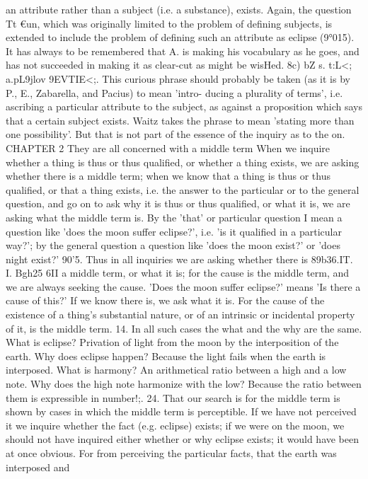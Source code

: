 an attribute rather than a subject (i.e. a substance), exists.
Again, the question Tt €un, which was originally limited to the
problem of defining subjects, is extended to include the problem
of defining such an attribute as eclipse (9°015). It has always to
be remembered that A. is making his vocabulary as he goes, and
has not succeeded in making it as clear-cut as might be wisHed.
8c) bZ s. t:L<; a.pL9jlov 9EVTIE<;. This curious phrase should probably
be taken (as it is by P., E., Zabarella, and Pacius) to mean 'intro-
ducing a plurality of terms', i.e. ascribing a particular attribute
to the subject, as against a proposition which says that a certain
subject exists. Waitz takes the phrase to mean 'stating more than
one possibility'. But that is not part of the essence of the inquiry
as to the on.
CHAPTER 2
They are all concerned with a middle term
When we inquire whether a thing is thus or thus
qualified, or whether a thing exists, we are asking whether there
is a middle term; when we know that a thing is thus or thus
qualified, or that a thing exists, i.e. the answer to the particular
or to the general question, and go on to ask why it is thus or
thus qualified, or what it is, we are asking what the middle term
is. By the 'that' or particular question I mean a question like
'does the moon suffer eclipse?', i.e. 'is it qualified in a particular
way?'; by the general question a question like 'does the moon
exist?' or 'does night exist?'
90'5. Thus in all inquiries we are asking whether there is
89b36.IT.
I.
Bgh25
6II
a middle term, or what it is; for the cause is the middle term, and
we are always seeking the cause. 'Does the moon suffer eclipse?'
means 'Is there a cause of this?' If we know there is, we ask
what it is. For the cause of the existence of a thing's substantial
nature, or of an intrinsic or incidental property of it, is the
middle term.
14. In all such cases the what and the why are the same. What
is eclipse? Privation of light from the moon by the interposition
of the earth. Why does eclipse happen? Because the light fails
when the earth is interposed. What is harmony? An arithmetical
ratio between a high and a low note. Why does the high note
harmonize with the low? Because the ratio between them is
expressible in number!;.
24. That our search is for the middle term is shown by cases
in which the middle term is perceptible. If we have not perceived
it we inquire whether the fact (e.g. eclipse) exists; if we were
on the moon, we should not have inquired either whether or why
eclipse exists; it would have been at once obvious. For from
perceiving the particular facts, that the earth was interposed and
